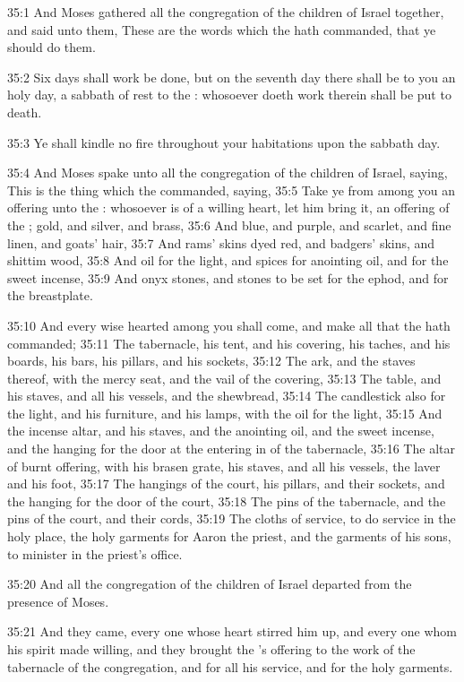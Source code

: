 35:1 And Moses gathered all the congregation of the children of Israel together, and said unto them, These are the words which the \LORD hath commanded, that ye should do them.

35:2 Six days shall work be done, but on the seventh day there shall be to you an holy day, a sabbath of rest to the \LORD: whosoever doeth work therein shall be put to death.

35:3 Ye shall kindle no fire throughout your habitations upon the sabbath day.

35:4 And Moses spake unto all the congregation of the children of Israel, saying, This is the thing which the \LORD commanded, saying, 35:5 Take ye from among you an offering unto the \LORD: whosoever is of a willing heart, let him bring it, an offering of the \LORD; gold, and silver, and brass, 35:6 And blue, and purple, and scarlet, and fine linen, and goats' hair, 35:7 And rams' skins dyed red, and badgers' skins, and shittim wood, 35:8 And oil for the light, and spices for anointing oil, and for the sweet incense, 35:9 And onyx stones, and stones to be set for the ephod, and for the breastplate.

35:10 And every wise hearted among you shall come, and make all that the \LORD hath commanded; 35:11 The tabernacle, his tent, and his covering, his taches, and his boards, his bars, his pillars, and his sockets, 35:12 The ark, and the staves thereof, with the mercy seat, and the vail of the covering, 35:13 The table, and his staves, and all his vessels, and the shewbread, 35:14 The candlestick also for the light, and his furniture, and his lamps, with the oil for the light, 35:15 And the incense altar, and his staves, and the anointing oil, and the sweet incense, and the hanging for the door at the entering in of the tabernacle, 35:16 The altar of burnt offering, with his brasen grate, his staves, and all his vessels, the laver and his foot, 35:17 The hangings of the court, his pillars, and their sockets, and the hanging for the door of the court, 35:18 The pins of the tabernacle, and the pins of the court, and their cords, 35:19 The cloths of service, to do service in the holy place, the holy garments for Aaron the priest, and the garments of his sons, to minister in the priest's office.

35:20 And all the congregation of the children of Israel departed from the presence of Moses.

35:21 And they came, every one whose heart stirred him up, and every one whom his spirit made willing, and they brought the \LORD's offering to the work of the tabernacle of the congregation, and for all his service, and for the holy garments.

